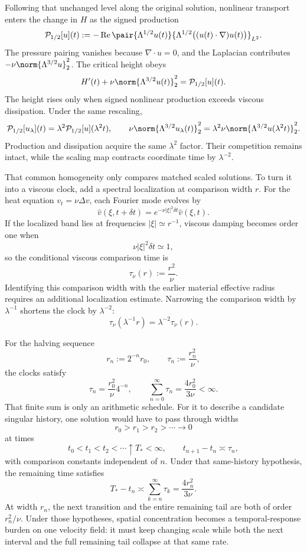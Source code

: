 Following that unchanged level along the original solution, nonlinear transport enters the change in \(H\) as the signed production
\[
  \mathcal P_{1/2}[u](t)
  :=
  -\operatorname{Re}
  \pair
    {\Lambda^{1/2}u(t)}
    {\Lambda^{1/2}\bigl((u(t)\cdot\nabla)u(t)\bigr)}_{L^2}.
\]
The pressure pairing vanishes because \(\nabla\cdot u=0\), and the Laplacian contributes \(-\nu\norm{\Lambda^{3/2}u}_2^2\). The critical height obeys
\[
  H'(t)
  +
  \nu\norm{\Lambda^{3/2}u(t)}_2^2
  =
  \mathcal P_{1/2}[u](t).
\]
The height rises only when signed nonlinear production exceeds viscous dissipation. Under the same rescaling,
\[
  \mathcal P_{1/2}[u_\lambda](t)
  =
  \lambda^2\mathcal P_{1/2}[u](\lambda^2t),
  \qquad
  \nu\norm{\Lambda^{3/2}u_\lambda(t)}_2^2
  =
  \lambda^2\nu\norm{\Lambda^{3/2}u(\lambda^2t)}_2^2.
\]
Production and dissipation acquire the same \(\lambda^2\) factor. Their competition remains intact, while the scaling map contracts coordinate time by \(\lambda^{-2}\).


That common homogeneity only compares matched scaled solutions. To turn it into a viscous clock, add a spectral localization at comparison width \(r\). For the heat equation \(v_t=\nu\Delta v\), each Fourier mode evolves by
\[
  \widehat v(\xi,t+\delta t)
  =
  e^{-\nu|\xi|^2\delta t}\widehat v(\xi,t).
\]
If the localized band lies at frequencies \(|\xi|\simeq r^{-1}\), viscous damping becomes order one when
\[
  \nu|\xi|^2\delta t\simeq1,
\]
so the conditional viscous comparison time is
\[
  \tau_\nu(r)
  :=
  \frac{r^2}{\nu}.
\]
Identifying this comparison width with the earlier material effective radius requires an additional localization estimate. Narrowing the comparison width by \(\lambda^{-1}\) shortens the clock by \(\lambda^{-2}\):
\[
  \tau_\nu(\lambda^{-1}r)
  =
  \lambda^{-2}\tau_\nu(r).
\]


For the halving sequence
\[
  r_n:=2^{-n}r_0,
  \qquad
  \tau_n:=\frac{r_n^2}{\nu},
\]
the clocks satisfy
\[
  \tau_n
  =
  \frac{r_0^2}{\nu}4^{-n},
  \qquad
  \sum_{n=0}^{\infty}\tau_n
  =
  \frac{4r_0^2}{3\nu}
  <
  \infty.
\]
That finite sum is only an arithmetic schedule. For it to describe a candidate singular history, one \NavierStokes{} solution would have to pass through widths
\[
  r_0>r_1>r_2>\cdots\longrightarrow0
\]
at times
\[
  t_0<t_1<t_2<\cdots\uparrow T_*<\infty,
  \qquad
  t_{n+1}-t_n\asymp\tau_n,
\]
with comparison constants independent of \(n\). Under that same-history hypothesis, the remaining time satisfies
\[
  T_*-t_n
  \asymp
  \sum_{k=n}^{\infty}\tau_k
  =
  \frac{4r_n^2}{3\nu}.
\]
At width \(r_n\), the next transition and the entire remaining tail are both of order \(r_n^2/\nu\). Under those hypotheses, spatial concentration becomes a temporal-response burden on one velocity field: it must keep changing scale while both the next interval and the full remaining tail collapse at that same rate.
